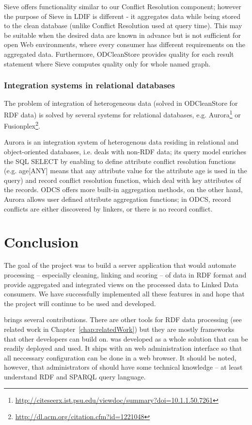Sieve offers functionality similar to our Conflict Resolution component; however the purpose of Sieve in LDIF is different - it aggregates data while being stored to the clean database (unlike Conflict Resolution used at query time). This may be suitable when the desired data are known in advance but is not sufficient for open Web environments, where every consumer has different requirements on the aggregated data. Furthermore, ODCleanStore provides quality for each result statement where Sieve computes quality only for whole named graph.

\subsection*{Integration systems in relational databases}

The problem of integration of heterogeneous data (solved in ODCleanStore for RDF data) is solved by several systems for relational databases, e.g. Aurora\footnote{\url{http://citeseerx.ist.psu.edu/viewdoc/summary?doi=10.1.1.50.7261}} or Fusionplex\footnote{\url{http://dl.acm.org/citation.cfm?id=1221048}}.


Aurora is an integration system of heterogenous data residing in relational and object-oriented databases, i.e. deals with non-RDF data; its query model enriches the SQL SELECT by enabling to define attribute conflict resolution functions (e.g. age[ANY] means that any attribute value for  the attribute age is used in the query) and record conflict  resolution function, which deal with key attributes of the records.   ODCS offers more built-in aggregation methods, on the other hand, Aurora allows user defined attribute aggregation functions; in ODCS, record conflicts are either discovered by linkers, or there is no record conflict.

\chapter{Conclusion}
The goal of the project was to build a server application that would automate processing -- especially cleaning, linking and scoring -- of data in RDF format and provide aggregated and integrated views on the processed data to Linked Data consumers. We have successfully implemented all these features in \odcs and hope that the project will continue to be used and developed.

\odcs brings several contributions. There are other tools for RDF data processing (see related work in Chapter~\ref{chap:relatedWork}) but they are mostly frameworks that other developers can build on. \odcs was developed as a whole solution that can be readily deployed and used. It ships with an web administration interface so that all neccessary configuration can be done in a web browser. It should be noted, however, that administrators of \odcs should have some technical knowledge -- at least understand RDF and SPARQL query language.

